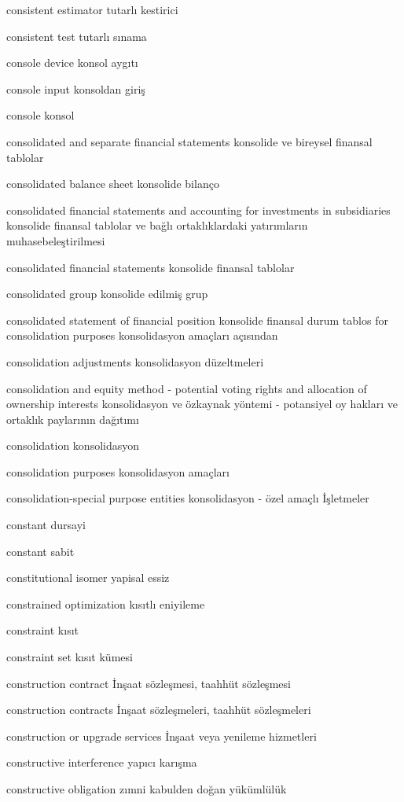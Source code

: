 \documentclass[12pt,fleqn]{article}\usepackage{../../common}
\begin{document}
consistent estimator tutarlı kestirici

consistent test tutarlı sınama

console device konsol aygıtı

console input konsoldan giriş

console konsol

consolidated and separate financial statements konsolide ve bireysel finansal tablolar

consolidated balance sheet konsolide bilanço

consolidated financial statements and accounting for investments in subsidiaries konsolide finansal tablolar ve bağlı ortaklıklardaki yatırımların muhasebeleştirilmesi

consolidated financial statements konsolide finansal tablolar

consolidated group konsolide edilmiş grup

consolidated statement of financial position konsolide finansal durum tablos for consolidation purposes konsolidasyon amaçları açısından

consolidation adjustments konsolidasyon düzeltmeleri

consolidation and equity method - potential voting rights and allocation of ownership interests konsolidasyon ve özkaynak yöntemi - potansiyel oy hakları ve ortaklık paylarının dağıtımı

consolidation konsolidasyon

consolidation purposes konsolidasyon amaçları

consolidation-special purpose entities konsolidasyon - özel amaçlı İşletmeler

constant dursayi

constant sabit

constitutional isomer yapisal essiz

constrained optimization kısıtlı eniyileme

constraint kısıt

constraint set kısıt kümesi

construction contract İnşaat sözleşmesi, taahhüt sözleşmesi

construction contracts İnşaat sözleşmeleri, taahhüt sözleşmeleri

construction or upgrade services İnşaat veya yenileme hizmetleri

constructive interference yapıcı karışma

constructive obligation zımni kabulden doğan yükümlülük
\end{document}
